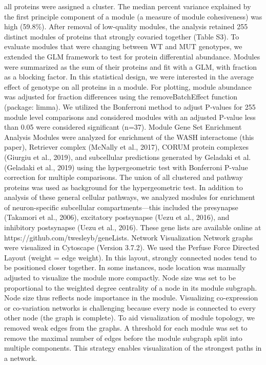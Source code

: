 all proteins were assigned a cluster. The median percent variance explained by
the first principle component of a module (a measure of module cohesiveness) was
high (59.8\%). After removal of low-quality modules, the analysis retained 255
distinct modules of proteins that strongly covaried together (Table S3). 
To evaluate modules that were changing between WT and MUT genotypes, we extended
the GLM framework to test for protein differential abundance. Modules were
summarized as the sum of their proteins and fit with a GLM, with fraction as a
blocking factor. In this statistical design, we were interested in the average
effect of genotype on all proteins in a module. For plotting, module abundance
was adjusted for fraction differences using the removeBatchEffect function
(package: limma).  We utilized the Bonferroni method to adjust P-values for 255
module level comparisons and considered modules with an adjusted P-value less
than 0.05 were considered significant (n=37).
Module Gene Set Enrichment Analysis
Modules were analyzed for enrichment of the WASH interactome (this paper),
Retriever complex (McNally et al., 2017), CORUM protein complexes (Giurgiu et
al., 2019), and subcellular predictions generated by Geladaki et al.(Geladaki et
al., 2019) using the hypergeometric test with Bonferroni P-value correction for
multiple comparisons. The union of all clustered and pathway proteins was used
as background for the hypergeometric test. In addition to analysis of these
general cellular pathways, we analyzed modules for enrichment of neuron-specific
subcellular compartments—this included the presynapse (Takamori et al., 2006),
excitatory postsynapse (Uezu et al., 2016), and inhibitory postsynapse (Uezu et
al., 2016). These gene lists are available online at
https://github.com/twesleyb/geneLists.
Network Visualization
Network graphs were visualized in Cytoscape (Version 3.7.2). We used the Perfuse
Force Directed Layout (weight = edge weight). In this layout, strongly connected
nodes tend to be positioned closer together. In some instances, node location
was manually adjusted to visualize the module more compactly. Node size was set
to be proportional to the weighted degree centrality of a node in its module
subgraph. Node size thus reflects node importance in the module. Visualizing
co-expression or co-variation networks is challenging because every node is
connected to every other node (the graph is complete). To aid visualization of
module topology, we removed weak edges from the graphs. A threshold for each
module was set to remove the maximal number of edges before the module subgraph
split into multiple components. This strategy enables visualization of the
strongest paths in a network.

